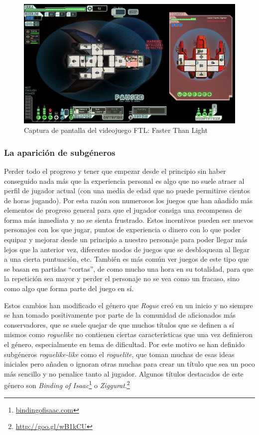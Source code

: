 \begin{figure}[h!]
		\includegraphics[width=\textwidth,height=\textheight,keepaspectratio]{./img/ftl.jpg}
	\caption{Captura de pantalla del videojuego FTL: Faster Than Light}
	\label{fig:ftl}
\end{figure}

\subsubsection{La aparición de subgéneros}

Perder todo el progreso y tener que empezar desde el principio sin haber conseguido nada más que la experiencia personal es algo que no suele atraer al perfil de jugador actual (con una media de edad que no puede permitirse cientos de horas jugando). Por esta razón son numerosos los juegos que han añadido más elementos de progreso general para que el jugador consiga una recompensa de forma más inmediata y no se sienta frustrado. Estos incentivos pueden ser nuevos personajes con los que jugar, puntos de experiencia o dinero con lo que poder equipar y mejorar desde un principio a nuestro personaje para poder llegar más lejos que la anterior vez, diferentes modos de juegos que se desbloquean al llegar a una cierta puntuación, etc.
También es más común ver juegos de este tipo que se basan en partidas ``cortas'', de como mucho una hora en su totalidad, para que la repetición sea mayor y perder el personaje no se vea como un fracaso, sino como algo que forma parte del juego en sí.

Estos cambios han modificado el género que \textit{Rogue} creó en un inicio y no siempre se han tomado positivamente por parte de la comunidad de aficionados más conservadores, que se suele quejar de que muchos títulos que se definen a sí mismos como \textit{roguelike} no contienen ciertas características que una vez definieron el género, especialmente en tema de dificultad. Por este motivo se han definido subgéneros \textit{roguelike-like} como el \textit{roguelite}\cite{Craddock2015a}, que toman muchas de esas ideas iniciales pero añaden o ignoran otras muchas para crear un título que sea un poco más sencillo y no penalice tanto al jugador. Algunos títulos destacados de este género son \textit{Binding of Isaac}\footnote{\url{bindingofisaac.com}} o \textit{Ziggurat}.\footnote{\url{http://goo.gl/wB1kCU}}

